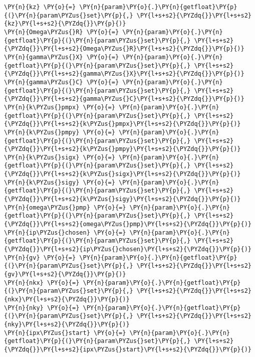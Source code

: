 \begin{Verbatim}[commandchars=\\\{\}]
\PY{n}{kz} \PY{o}{=} \PY{n}{param}\PY{o}{.}\PY{n}{getfloat}\PY{p}{(}\PY{n}{param\PYZus{}set}\PY{p}{,} \PY{l+s+s2}{\PYZdq{}}\PY{l+s+s2}{kz}\PY{l+s+s2}{\PYZdq{}}\PY{p}{)}
\PY{n}{Omega\PYZus{}R} \PY{o}{=} \PY{n}{param}\PY{o}{.}\PY{n}{getfloat}\PY{p}{(}\PY{n}{param\PYZus{}set}\PY{p}{,} \PY{l+s+s2}{\PYZdq{}}\PY{l+s+s2}{Omega\PYZus{}R}\PY{l+s+s2}{\PYZdq{}}\PY{p}{)}
\PY{n}{gamma\PYZus{}X} \PY{o}{=} \PY{n}{param}\PY{o}{.}\PY{n}{getfloat}\PY{p}{(}\PY{n}{param\PYZus{}set}\PY{p}{,} \PY{l+s+s2}{\PYZdq{}}\PY{l+s+s2}{gamma\PYZus{}X}\PY{l+s+s2}{\PYZdq{}}\PY{p}{)}
\PY{n}{gamma\PYZus{}C} \PY{o}{=} \PY{n}{param}\PY{o}{.}\PY{n}{getfloat}\PY{p}{(}\PY{n}{param\PYZus{}set}\PY{p}{,} \PY{l+s+s2}{\PYZdq{}}\PY{l+s+s2}{gamma\PYZus{}C}\PY{l+s+s2}{\PYZdq{}}\PY{p}{)}
\PY{n}{k\PYZus{}pmpx} \PY{o}{=} \PY{n}{param}\PY{o}{.}\PY{n}{getfloat}\PY{p}{(}\PY{n}{param\PYZus{}set}\PY{p}{,} \PY{l+s+s2}{\PYZdq{}}\PY{l+s+s2}{k\PYZus{}pmpx}\PY{l+s+s2}{\PYZdq{}}\PY{p}{)}
\PY{n}{k\PYZus{}pmpy} \PY{o}{=} \PY{n}{param}\PY{o}{.}\PY{n}{getfloat}\PY{p}{(}\PY{n}{param\PYZus{}set}\PY{p}{,} \PY{l+s+s2}{\PYZdq{}}\PY{l+s+s2}{k\PYZus{}pmpy}\PY{l+s+s2}{\PYZdq{}}\PY{p}{)}
\PY{n}{k\PYZus{}sigx} \PY{o}{=} \PY{n}{param}\PY{o}{.}\PY{n}{getfloat}\PY{p}{(}\PY{n}{param\PYZus{}set}\PY{p}{,} \PY{l+s+s2}{\PYZdq{}}\PY{l+s+s2}{k\PYZus{}sigx}\PY{l+s+s2}{\PYZdq{}}\PY{p}{)}
\PY{n}{k\PYZus{}sigy} \PY{o}{=} \PY{n}{param}\PY{o}{.}\PY{n}{getfloat}\PY{p}{(}\PY{n}{param\PYZus{}set}\PY{p}{,} \PY{l+s+s2}{\PYZdq{}}\PY{l+s+s2}{k\PYZus{}sigy}\PY{l+s+s2}{\PYZdq{}}\PY{p}{)}
\PY{n}{omega\PYZus{}pmp} \PY{o}{=} \PY{n}{param}\PY{o}{.}\PY{n}{getfloat}\PY{p}{(}\PY{n}{param\PYZus{}set}\PY{p}{,} \PY{l+s+s2}{\PYZdq{}}\PY{l+s+s2}{omega\PYZus{}pmp}\PY{l+s+s2}{\PYZdq{}}\PY{p}{)}
\PY{n}{ip\PYZus{}chosen} \PY{o}{=} \PY{n}{param}\PY{o}{.}\PY{n}{getfloat}\PY{p}{(}\PY{n}{param\PYZus{}set}\PY{p}{,} \PY{l+s+s2}{\PYZdq{}}\PY{l+s+s2}{ip\PYZus{}chosen}\PY{l+s+s2}{\PYZdq{}}\PY{p}{)}
\PY{n}{gv} \PY{o}{=} \PY{n}{param}\PY{o}{.}\PY{n}{getfloat}\PY{p}{(}\PY{n}{param\PYZus{}set}\PY{p}{,} \PY{l+s+s2}{\PYZdq{}}\PY{l+s+s2}{gv}\PY{l+s+s2}{\PYZdq{}}\PY{p}{)}
\PY{n}{nkx} \PY{o}{=} \PY{n}{param}\PY{o}{.}\PY{n}{getfloat}\PY{p}{(}\PY{n}{param\PYZus{}set}\PY{p}{,} \PY{l+s+s2}{\PYZdq{}}\PY{l+s+s2}{nkx}\PY{l+s+s2}{\PYZdq{}}\PY{p}{)}
\PY{n}{nky} \PY{o}{=} \PY{n}{param}\PY{o}{.}\PY{n}{getfloat}\PY{p}{(}\PY{n}{param\PYZus{}set}\PY{p}{,} \PY{l+s+s2}{\PYZdq{}}\PY{l+s+s2}{nky}\PY{l+s+s2}{\PYZdq{}}\PY{p}{)}
\PY{n}{ipx\PYZus{}start} \PY{o}{=} \PY{n}{param}\PY{o}{.}\PY{n}{getfloat}\PY{p}{(}\PY{n}{param\PYZus{}set}\PY{p}{,} \PY{l+s+s2}{\PYZdq{}}\PY{l+s+s2}{ipx\PYZus{}start}\PY{l+s+s2}{\PYZdq{}}\PY{p}{)}

\end{Verbatim}
